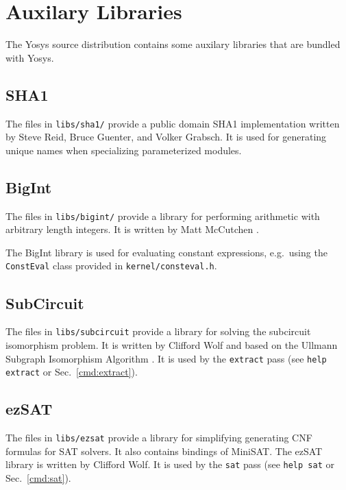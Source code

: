 
\chapter{Auxilary Libraries}

The Yosys source distribution contains some auxilary libraries that are bundled
with Yosys.

\section{SHA1}

The files in {\tt libs/sha1/} provide a public domain SHA1 implementation written
by Steve Reid, Bruce Guenter, and Volker Grabsch. It is used for generating
unique names when specializing parameterized modules.

\section{BigInt}

The files in {\tt libs/bigint/} provide a library for performing arithmetic with
arbitrary length integers. It is written by Matt McCutchen .

The BigInt library is used for evaluating constant expressions, e.g.~using the {\tt
ConstEval} class provided in {\tt kernel/consteval.h}.

\section{SubCircuit}
\label{sec:SubCircuit}

The files in {\tt libs/subcircuit} provide a library for solving the subcircuit
isomorphism problem. It is written by Clifford Wolf and based on the Ullmann
Subgraph Isomorphism Algorithm \cite{UllmannSubgraphIsomorphism}. It is used by
the {\tt extract} pass (see {\tt help extract} or Sec.~\ref{cmd:extract}).

\section{ezSAT}

The files in {\tt libs/ezsat} provide a library for simplifying generating CNF
formulas for SAT solvers. It also contains bindings of MiniSAT. The ezSAT
library is written by Clifford Wolf. It is used by the {\tt sat} pass (see
{\tt help sat} or Sec.~\ref{cmd:sat}).

